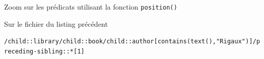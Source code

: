 \begin{frame}{Zoom sur les prédicats utilisant la fonction \texttt{position()}}
\begin{tiny}
\begin{exampleblock}{Sur le fichier du listing précédent}

\verb?/child::library/child::book/child::author[contains(text(),"Rigaux")]/preceding-sibling::*[1] ?


\end{exampleblock}
\end{tiny}

\end{frame}


